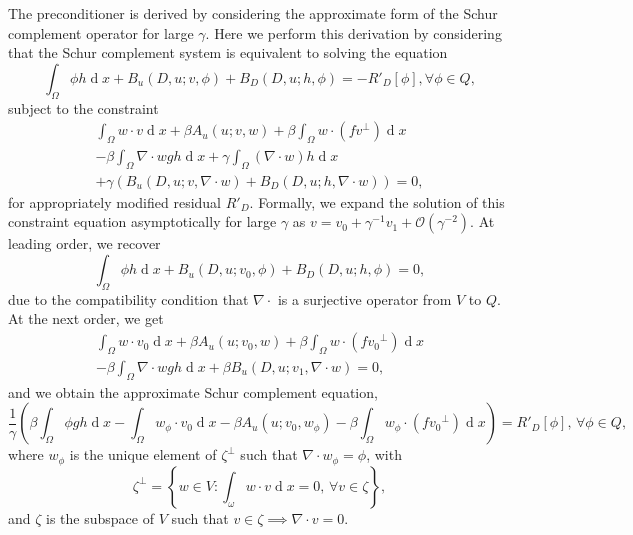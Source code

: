 \documentclass[pdflatex,sn-mathphys]{sn-jnl}%
\theoremstyle{thmstyleone}%
\theoremstyle{thmstyletwo}%
\theoremstyle{thmstylethree}%
\DeclareMathOperator{\diff}{d}
\begin{document}
The preconditioner is derived by considering the approximate form of
the Schur complement operator for large $\gamma$. Here we perform
this derivation by considering that the Schur complement system is
equivalent to solving the equation
\begin{equation}
    \int_{\Omega}\phi h\diff x
  + B_u(D,u;v,\phi)
  + B_D(D,u;h,\phi)
  = -R'_D[\phi], \forall \phi \in Q,
\end{equation}
subject to the constraint
\begin{align}
  \int_{\Omega}{w}\cdot v\diff x
  + \beta A_u(u;v,w)
    + \beta \int_\Omega{w}\cdot (f{v}^\perp) \diff x
\nonumber\\
- \beta \int_{\Omega}\nabla\cdot{w} gh \diff x
+  \gamma\int_{\Omega}(\nabla\cdot w) h\diff x \nonumber \\
  + \gamma\left(B_u(D,u;v,\nabla\cdot w)
  + B_D(D,u;h,\nabla\cdot w)\right) = 0,
\end{align}
for appropriately modified residual $R'_D$. Formally, we expand the
solution of this constraint equation asymptotically for large $\gamma$
as $v=v_0 + \gamma^{-1}v_1 + \mathcal{O}(\gamma^{-2})$. At leading
order, we recover
\begin{equation}
  \int_{\Omega}\phi h\diff x
  + B_u(D,u;v_0,\phi)
  + B_D(D,u;h,\phi)
  = 0,
\end{equation}
due to the compatibility condition that $\nabla\cdot$ is a surjective
operator from $V$ to $Q$. At the next order, we get
\begin{align}
  \int_{\Omega}{w}\cdot v_0\diff x
  + \beta A_u(u;v_0,w)
  + \beta \int_\Omega{w}\cdot (f{v_0}^\perp) \diff x
  \nonumber\\
  - \beta \int_{\Omega}\nabla\cdot{w} gh \diff x
  + \beta B_u(D,u;v_1,\nabla\cdot w)
  = 0,
\end{align}
and we obtain the approximate Schur complement equation,
\begin{equation}
  \frac{1}{\gamma}\left(\beta \int_{\Omega}\phi gh \diff x
  -\int_{\Omega}{w_\phi}\cdot v_0\diff x
  - \beta A_u(u;v_0,w_\phi)
  - \beta \int_\Omega{w_\phi}\cdot (f{v_0}^\perp) \diff x\right)
  = R'_D[\phi], \, \forall \phi \in Q,
\end{equation}
where $w_\phi$ is the unique element of $\zeta^\perp$ such
that $\nabla\cdot w_\phi=\phi$, with
\begin{equation}
  \zeta^\perp = \left\{ w\in V: \int_\omega w\cdot v \diff x
  = 0, \, \forall v\in \zeta\right\},
\end{equation}
and $\zeta$ is the subspace of $V$ such that $v\in\zeta\implies
\nabla\cdot v=0$.
\end{document}
